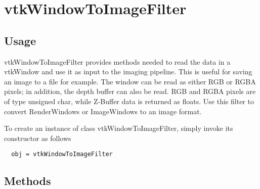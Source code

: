 \section{vtkWindowToImageFilter}

\subsection{Usage}

 vtkWindowToImageFilter provides methods needed to read the data in
 a vtkWindow and use it as input to the imaging pipeline. This is
 useful for saving an image to a file for example. The window can
 be read as either RGB or RGBA pixels;  in addition, the depth buffer
 can also be read.   RGB and RGBA pixels are of type unsigned char,
 while Z-Buffer data is returned as floats.  Use this filter
 to convert RenderWindows or ImageWindows to an image format.  


To create an instance of class vtkWindowToImageFilter, simply
invoke its constructor as follows
\begin{verbatim}
  obj = vtkWindowToImageFilter
\end{verbatim}
\subsection{Methods}


